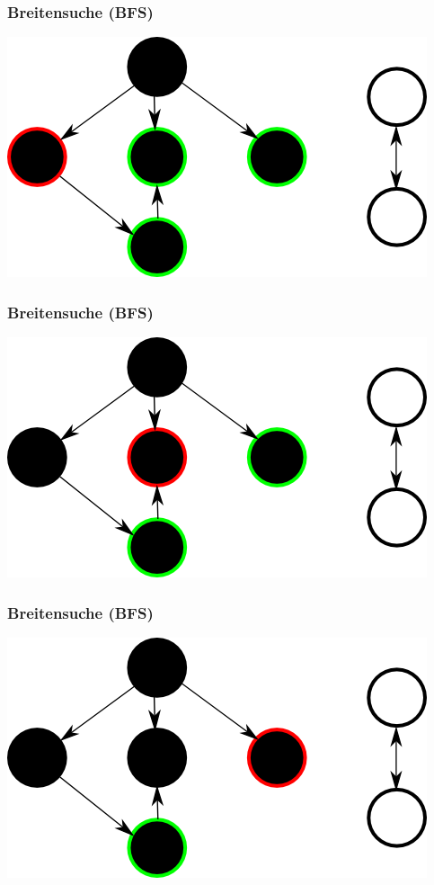 \documentclass{beamer}
\begin{document}
\begin{frame}
\frametitle{Breitensuche (BFS)}
\includegraphics{bfs4}
\end{frame}


\begin{frame}
\frametitle{Breitensuche (BFS)}
\includegraphics{bfs5}
\end{frame}


\begin{frame}
\frametitle{Breitensuche (BFS)}
\includegraphics{bfs6}
\end{frame}
\end{document}
